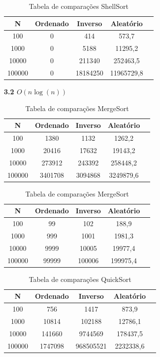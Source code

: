 \documentclass[10pt]{article}
\begin{document}
\begin{table}[H]
  \centering
  \caption{Tabela de comparações ShellSort}
  \begin{tabular}{|c|c|c|c|c|}
  \hline
  N & Ordenado & Inverso & Aleatório \\ \hline
  100 & 0 & 414 & 573,7 \\ \hline
  1000 & 0 & 5188 & 11295,2 \\ \hline
  10000 & 0 & 211340 & 252463,5 \\ \hline
  100000 & 0 & 18184250 & 11965729,8 \\ \hline
  \end{tabular}
\end{table}

\vspace{0.5cm}

\textbf{3.2 $O(n \log(n))$}

\begin{table}[H]
  \parbox{.45\linewidth}{
    \centering
    \caption{Tabela de comparações HeapSort}
    \begin{tabular}{|c|c|c|c|c|}
    \hline
    N & Ordenado & Inverso & Aleatório \\ \hline
    100 & 1380 & 1132 & 1262,2 \\ \hline
    1000 & 20416 & 17632 & 19143,2 \\ \hline
    10000 & 273912 & 243392 & 258448,2 \\ \hline
    100000 & 3401708 & 3094868 & 3249879,6 \\ \hline
    \end{tabular}
  }
  \hfill
  \parbox{.45\linewidth}{
    \centering
    \caption{Tabela de comparações MergeSort}
    \begin{tabular}{|c|c|c|c|c|}
    \hline
    N & Ordenado & Inverso & Aleatório \\ \hline
    100 & 99 & 102 & 188,9 \\ \hline
    1000 & 999 & 1001 & 1981,3 \\ \hline
    10000 & 9999 & 10005 & 19977,4 \\ \hline
    100000 & 99999 & 100006 & 199975,4 \\ \hline
    \end{tabular}
  }
\end{table}

\begin{table}[H]
  \centering
  \caption{Tabela de comparações QuickSort}
  \begin{tabular}{|c|c|c|c|c|}
  \hline
  N & Ordenado & Inverso & Aleatório \\ \hline
  100 & 756 & 1417 & 873,9 \\ \hline
  1000 & 10814 & 102188 & 12786,1 \\ \hline
  10000 & 141660 & 9744569 & 178437,5 \\ \hline
  100000 & 1747098 & 968505521 & 2232338,6 \\ \hline
  \end{tabular}
\end{table}
\end{document}
